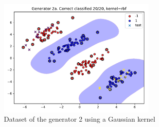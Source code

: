 \documentclass[12pt,a4paper]{article}
\begin{document}
\begin{figure}[h]
	\centering
	\includegraphics[width=0.7\textwidth]{ex1/2a.pdf}
	\caption{Dataset of the generator 2 using a Gaussian kernel}
	\label{fig:ex1gen2a}
\end{figure}
%
\end{document}
